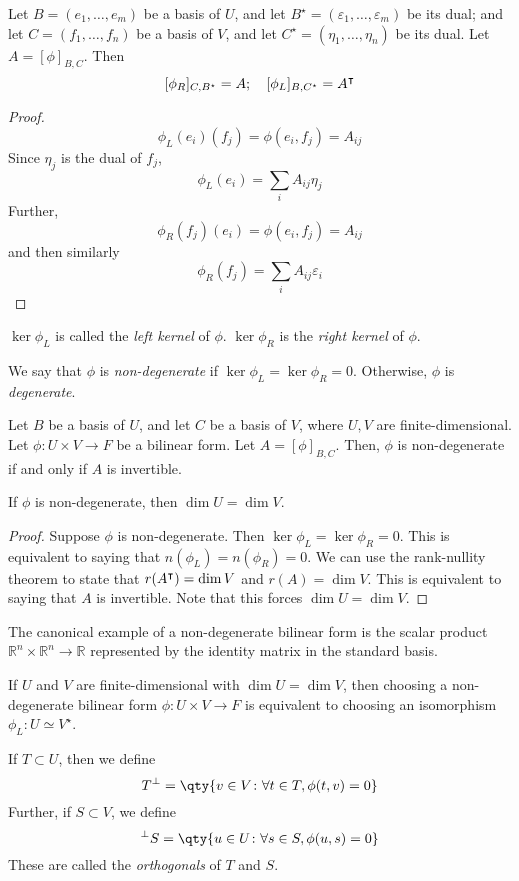 \begin{lemma}
	Let $B = (e_1, \dots, e_m)$ be a basis of $U$, and let $B^\star = (\varepsilon_1, \dots, \varepsilon_m)$ be its dual; and let $C = (f_1, \dots, f_n)$ be a basis of $V$, and let $C^\star = (\eta_1, \dots, \eta_n)$ be its dual.
	Let $A = [\phi]_{B,C}$.
	Then
	\[
		[\phi_R]_{C, B^\star} = A;\quad [\phi_L]_{B, C^\star} = A^\intercal
	\]
\end{lemma}
\begin{proof}
	\[
		\phi_L(e_i)(f_j) = \phi(e_i, f_j) = A_{ij}
	\]
	Since $\eta_j$ is the dual of $f_j$,
	\[
		\phi_L(e_i) = \sum_i A_{ij} \eta_j
	\]
	Further,
	\[
		\phi_R(f_j)(e_i) = \phi(e_i, f_j) = A_{ij}
	\]
	and then similarly
	\[
		\phi_R(f_j) = \sum_i A_{ij} \varepsilon_i
	\]
\end{proof}
\begin{definition}
	$\ker \phi_L$ is called the \textit{left kernel} of $\phi$.
	$\ker \phi_R$ is the \textit{right kernel} of $\phi$.
\end{definition}
\begin{definition}
	We say that $\phi$ is \textit{non-degenerate} if $\ker \phi_L = \ker \phi_R = \qty{0}$.
	Otherwise, $\phi$ is \textit{degenerate}.
\end{definition}
\begin{theorem}
	Let $B$ be a basis of $U$, and let $C$ be a basis of $V$, where $U, V$ are finite-dimensional.
	Let $\phi \colon U \times V \to F$ be a bilinear form.
	Let $A = [\phi]_{B,C}$.
	Then, $\phi$ is non-degenerate if and only if $A$ is invertible.
\end{theorem}
\begin{corollary}
	If $\phi$ is non-degenerate, then $\dim U = \dim V$.
\end{corollary}
\begin{proof}
	Suppose $\phi$ is non-degenerate.
	Then $\ker \phi_L = \ker \phi_R = \qty{0}$.
	This is equivalent to saying that $n(\phi_L) = n(\phi_R) = 0$.
	We can use the rank-nullity theorem to state that $r(A^\intercal) = \dim V$ and $r(A) = \dim V$.
	This is equivalent to saying that $A$ is invertible.
	Note that this forces $\dim U = \dim V$.
\end{proof}
\begin{remark}
	The canonical example of a non-degenerate bilinear form is the scalar product $\mathbb R^n \times \mathbb R^n \to \mathbb R$ represented by the identity matrix in the standard basis.
\end{remark}
\begin{corollary}
	If $U$ and $V$ are finite-dimensional with $\dim U = \dim V$, then choosing a non-degenerate bilinear form $\phi \colon U \times V \to F$ is equivalent to choosing an isomorphism $\phi_L \colon U \simeq V^\star$.
\end{corollary}
\begin{definition}
	If $T \subset U$, then we define
	\[
		T^\perp = \qty{ v \in V \colon \forall t \in T, \phi(t,v) = 0 }
	\]
	Further, if $S \subset V$, we define
	\[
		^\perp S = \qty{ u \in U \colon \forall s \in S, \phi(u,s) = 0 }
	\]
	These are called the \textit{orthogonals} of $T$ and $S$.
\end{definition}

